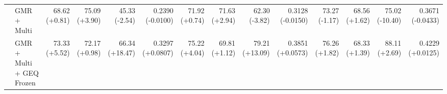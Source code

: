 \documentclass{article}
\begin{document}
{\begin{tabular}{llrrrrrrrrrrrr}
 & GMR + Multi & \shortstack{68.62 \\ {\scriptsize\textcolor{Gain}{(+0.81)}}} & \shortstack{75.09 \\ {\scriptsize\textcolor{Gain}{(+3.90)}}} & \shortstack{45.33 \\ {\scriptsize\textcolor{Loss}{(-2.54)}}} & \shortstack{0.2390 \\ {\scriptsize\textcolor{Loss}{(-0.0100)}}} & \shortstack{71.92 \\ {\scriptsize\textcolor{Gain}{(+0.74)}}} & \shortstack{71.63 \\ {\scriptsize\textcolor{Gain}{(+2.94)}}} & \shortstack{62.30 \\ {\scriptsize\textcolor{Loss}{(-3.82)}}} & \shortstack{0.3128 \\ {\scriptsize\textcolor{Loss}{(-0.0150)}}} & \shortstack{73.27 \\ {\scriptsize\textcolor{Loss}{(-1.17)}}} & \shortstack{68.56 \\ {\scriptsize\textcolor{Gain}{(+1.62)}}} & \shortstack{75.02 \\ {\scriptsize\textcolor{Loss}{(-10.40)}}} & \shortstack{0.3671 \\ {\scriptsize\textcolor{Loss}{(-0.0433)}}} \\
 & GMR + Multi + GEQ Frozen & \shortstack{73.33 \\ {\scriptsize\textcolor{Gain}{(+5.52)}}} & \shortstack{72.17 \\ {\scriptsize\textcolor{Gain}{(+0.98)}}} & \shortstack{66.34 \\ {\scriptsize\textcolor{Gain}{(+18.47)}}} & \shortstack{0.3297 \\ {\scriptsize\textcolor{Gain}{(+0.0807)}}} & \shortstack{75.22 \\ {\scriptsize\textcolor{Gain}{(+4.04)}}} & \shortstack{69.81 \\ {\scriptsize\textcolor{Gain}{(+1.12)}}} & \shortstack{79.21 \\ {\scriptsize\textcolor{Gain}{(+13.09)}}} & \shortstack{0.3851 \\ {\scriptsize\textcolor{Gain}{(+0.0573)}}} & \shortstack{76.26 \\ {\scriptsize\textcolor{Gain}{(+1.82)}}} & \shortstack{68.33 \\ {\scriptsize\textcolor{Gain}{(+1.39)}}} & \shortstack{88.11 \\ {\scriptsize\textcolor{Gain}{(+2.69)}}} & \shortstack{0.4229 \\ {\scriptsize\textcolor{Gain}{(+0.0125)}}} \\

\end{tabular}}
\end{document}
